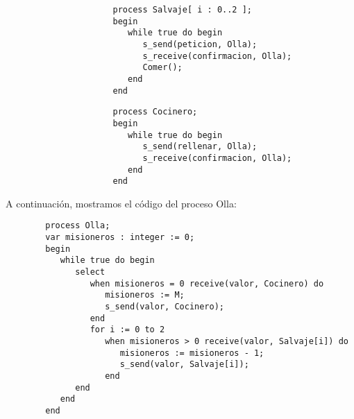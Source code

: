 \begin{ejercicio}
\begin{figure}[H]
        \centering
        \setlength{\columnsep}{1cm}
        \begin{multicols}{2}
            \begin{verbatim}
                process Salvaje[ i : 0..2 ];
                begin
                   while true do begin
                      s_send(peticion, Olla);
                      s_receive(confirmacion, Olla);
                      Comer();
                   end
                end
            \end{verbatim}
            \begin{verbatim}
                process Cocinero;
                begin
                   while true do begin
                      s_send(rellenar, Olla);
                      s_receive(confirmacion, Olla);
                   end
                end
            \end{verbatim}
        \end{multicols}
    \end{figure}
    A continuación, mostramos el código del proceso Olla:
    \begin{verbatim}
        process Olla;
        var misioneros : integer := 0;
        begin
           while true do begin
              select 
                 when misioneros = 0 receive(valor, Cocinero) do
                    misioneros := M;
                    s_send(valor, Cocinero);
                 end
                 for i := 0 to 2 
                    when misioneros > 0 receive(valor, Salvaje[i]) do
                       misioneros := misioneros - 1;
                       s_send(valor, Salvaje[i]);
                    end
              end
           end
        end
    \end{verbatim}
\end{ejercicio}

